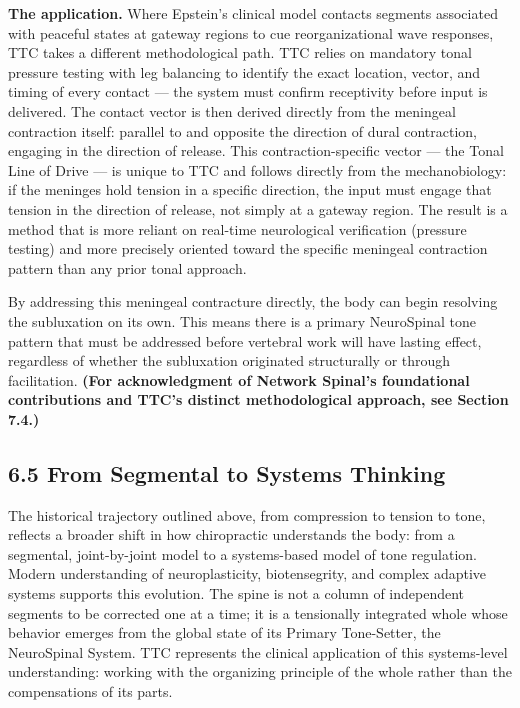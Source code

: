 \documentclass[11pt,letterpaper]{article}
\begin{document}
\textbf{The application.} Where Epstein's clinical model contacts segments associated with peaceful states at gateway regions to cue reorganizational wave responses, TTC takes a different methodological path. TTC relies on mandatory tonal pressure testing with leg balancing to identify the exact location, vector, and timing of every contact — the system must confirm receptivity before input is delivered. The contact vector is then derived directly from the meningeal contraction itself: parallel to and opposite the direction of dural contraction, engaging in the direction of release. This contraction-specific vector — the Tonal Line of Drive — is unique to TTC and follows directly from the mechanobiology: if the meninges hold tension in a specific direction, the input must engage that tension in the direction of release, not simply at a gateway region. The result is a method that is more reliant on real-time neurological verification (pressure testing) and more precisely oriented toward the specific meningeal contraction pattern than any prior tonal approach.


By addressing this meningeal contracture directly, the body can begin resolving the subluxation on its own. This means there is a primary NeuroSpinal tone pattern that must be addressed before vertebral work will have lasting effect, regardless of whether the subluxation originated structurally or through facilitation. \textbf{(For acknowledgment of Network Spinal's foundational contributions and TTC's distinct methodological approach, see Section 7.4.)}


\subsection{6.5 From Segmental to Systems Thinking}

The historical trajectory outlined above, from compression to tension to tone, reflects a broader shift in how chiropractic understands the body: from a segmental, joint-by-joint model to a systems-based model of tone regulation. Modern understanding of neuroplasticity, biotensegrity, and complex adaptive systems supports this evolution. The spine is not a column of independent segments to be corrected one at a time; it is a tensionally integrated whole whose behavior emerges from the global state of its Primary Tone-Setter, the NeuroSpinal System. TTC represents the clinical application of this systems-level understanding: working with the organizing principle of the whole rather than the compensations of its parts.
\end{document}
